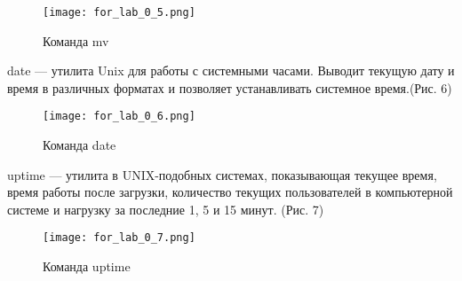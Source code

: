 \documentclass[a4paper,14pt]{extarticle}
\begin{document}
\begin{figure}[h]
\centering
\texttt{[image: for\_lab\_0\_5.png]}
\caption{Команда mv}
\label{fig:mpr}
\end{figure}

date — утилита Unix для работы с системными часами. Выводит текущую дату и время в различных форматах и позволяет устанавливать системное время.(Рис. 6)

\begin{figure}[h]

\centering

\texttt{[image: for\_lab\_0\_6.png]}

\caption{Команда date}

\label{fig:mpr}

\end{figure}

uptime — утилита в UNIX-подобных системах, показывающая текущее время, время работы после загрузки, количество текущих пользователей в компьютерной системе и нагрузку за последние 1, 5 и 15 минут. (Рис. 7)

\begin{figure}[h]

\centering

\texttt{[image: for\_lab\_0\_7.png]}

\caption{Команда uptime}

\label{fig:mpr}

\end{figure}



%
%    
\end{document}
